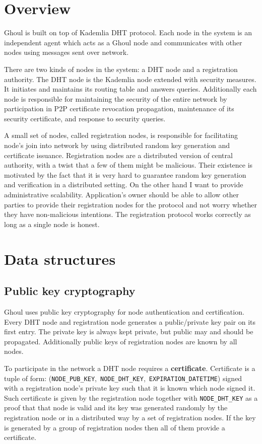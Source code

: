 \section{Overview}
\label{sec:ghoul_overview}
Ghoul is built on top of Kademlia DHT protocol. Each node in the system is an
independent agent which acts as a Ghoul node and communicates with other nodes
using messages sent over network.

There are two kinds of nodes in the system: a DHT node and a registration
authority. The DHT node is the Kademlia node extended with security measures.
It initiates and maintains its routing table and answers queries. Additionally
each node is responsible for maintaining the security of the entire network by
participation in P2P certificate revocation propagation, maintenance of its
security certificate, and response to security queries.

A small set of nodes, called registration nodes, is responsible for facilitating
node’s join into network by using distributed random key generation and
certificate issuance. Registration nodes are a distributed version of central
authority, with a twist that a few of them might be malicious. Their existence
is motivated by the fact that it is very hard to guarantee random key generation
and verification in a distributed setting. On the other hand I want to provide
administrative scalability. Application's owner should be able to allow other
parties to provide their registration nodes for the protocol and not worry
whether they have non-malicious intentions. The registration protocol works
correctly as long as a single node is honest.

\section{Data structures}
\label{sec:ghoul_data}

\subsection{Public key cryptography}
Ghoul uses public key cryptography for node authentication and certification.
Every DHT node and registration node generates a public/private key pair on its
first entry. The private key is always kept private, but public may and should
be propagated. Additionally public keys of registration nodes are known by all
nodes.

To participate in the network a DHT node requires a \textbf{certificate}.
Certificate is a tuple of form:
(\texttt{NODE\_PUB\_KEY},~\texttt{NODE\_DHT\_KEY},~\texttt{EXPIRATION\_DATETIME})
signed with a registration node's private key such that it is known which node
signed it. Such certificate is given by the registration node together with
\texttt{NODE\_DHT\_KEY} as a proof that that node is valid and its key was
generated randomly by the registration node or in a distributed way by a set of
registration nodes. If the key is generated by a group of registration nodes
then all of them provide a certificate.

